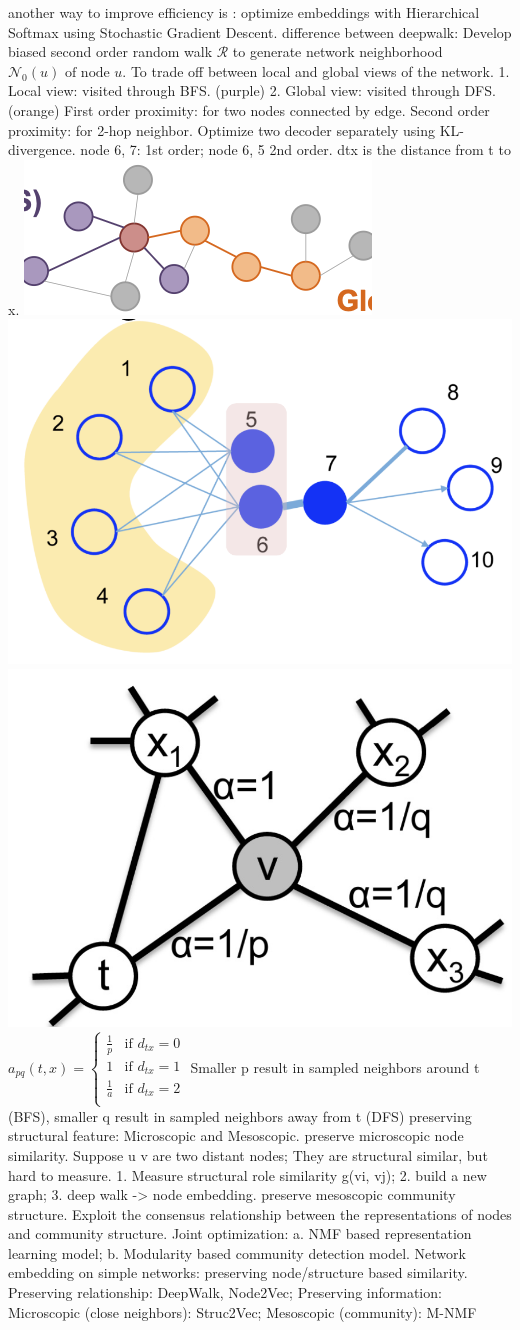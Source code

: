 another way to improve efficiency is 
: optimize embeddings with Hierarchical Softmax using Stochastic Gradient Descent.
 difference between deepwalk: Develop biased second order random walk  \(\mathcal{R}\) to generate network neighborhood  \(\mathcal{N}_0(u) \text{ of node } u.\)
To trade off between local and global views of the network.
1. Local view: visited through BFS. (purple)
2. Global view: visited through DFS. (orange)
 First order proximity: for two nodes connected by edge. Second order proximity: for 2-hop neighbor. Optimize two decoder separately using KL-divergence. node 6, 7: 1st order; node 6, 5 2nd order. dtx is the distance from t to x.
\includegraphics[height=0.03\textwidth]{figs/l3-4.png}
\includegraphics[height=0.03\textwidth]{figs/l3-2.png}
\includegraphics[height=0.03\textwidth]{figs/l3-3.png}
\(a_{pq}(t, x) = 
\begin{cases} 
\frac{1}{p} & \text{if } d_{tx} = 0 \\
1 & \text{if } d_{tx} = 1 \\
\frac{1}{a} & \text{if } d_{tx} = 2 \\
\end{cases}
\)
Smaller p result in sampled neighbors around t (BFS), smaller q result in sampled neighbors away from t (DFS)
 preserving structural feature: Microscopic and Mesoscopic.
preserve microscopic node similarity. Suppose u v are two distant nodes; They are structural similar, but hard to measure. 1. Measure structural role similarity g(vi, vj); 2. build a new graph; 3. deep walk -> node embedding.
 preserve mesoscopic community structure.
Exploit the consensus relationship between the representations of nodes and community structure.
Joint optimization: a. NMF based representation learning model; b. Modularity based community detection model.
Network embedding on simple networks: preserving node/structure based similarity. Preserving  relationship: DeepWalk, Node2Vec; Preserving  information: Microscopic (close neighbors): Struc2Vec; Mesoscopic (community): M-NMF

